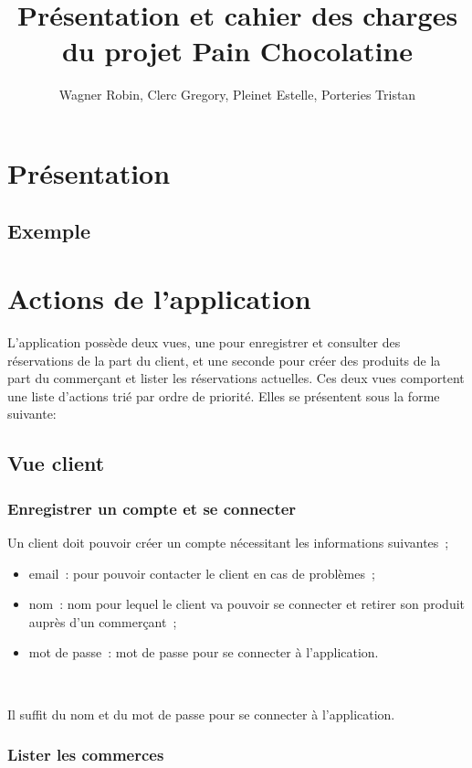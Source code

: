 \documentclass[a4paper,12pt]{article}
\title{Présentation et cahier des charges du projet Pain Chocolatine}
\author{Wagner Robin, Clerc Gregory, Pleinet Estelle, Porteries Tristan}
\begin{document}
\maketitle

\tableofcontents

\section{Présentation}

\subsection{Exemple}

\section{Actions de l'application}

L'application possède deux vues, une pour enregistrer et consulter des réservations de la part du client, et une seconde pour créer des produits de la part du commerçant et lister les réservations actuelles. Ces deux vues comportent une liste d'actions trié par ordre de priorité. Elles se présentent sous la forme suivante:

\subsection{Vue client}

\subsubsection{Enregistrer un compte et se connecter}

Un client doit pouvoir créer un compte nécessitant les informations suivantes~;
\begin{itemize}
	\item email~: pour pouvoir contacter le client en cas de problèmes~;
	\item nom~: nom pour lequel le client va pouvoir se connecter et retirer son produit auprès d'un commerçant~;
	\item mot de passe~: mot de passe pour se connecter à l'application.
\end{itemize} \

Il suffit du nom et du mot de passe pour se connecter à l'application.

\subsubsection{Lister les commerces}
\end{document}

